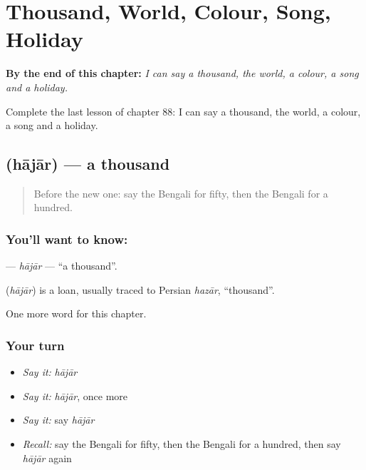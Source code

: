 
\chapter{Thousand, World, Colour, Song, Holiday}
\label{ch:bn-thousand-world-colour-song-holiday}

\begin{chapteropening}
\textbf{By the end of this chapter:} \emph{I can say a thousand, the world, a colour, a song and a holiday.}

Complete the last lesson of chapter 88: I can say a thousand, the world, a colour, a song and a holiday.
\end{chapteropening}

\section[\texorpdfstring{\bn{হাজার} (hājār)}{হাজার (hājār)}]{ (hājār) — a thousand}

\label{lesson:BN-C88-hajar}



\begin{quote}
Before the new one: say the Bengali for fifty, then the Bengali for a hundred.
\end{quote}

\subsection*{You'll want to know: }
\textbf{} — \emph{hājār} — \textquotedblleft{}a thousand\textquotedblright{}.

\begin{cousinweb}
\textbf{} (\emph{hājār}) is a loan, usually traced to Persian \emph{hazār}, \textquotedblleft{}thousand\textquotedblright{}.
\end{cousinweb}

\begin{grammarlens}[title={What you've built}]
One more word for this chapter.
\end{grammarlens}

\subsection*{Your turn}
\begin{itemize}
\raggedright
  \item \emph{Say it:} \emph{hājār}
  \item \emph{Say it:} \emph{hājār}, once more
  \item \emph{Say it:} say \emph{hājār}
  \item \emph{Recall:} say the Bengali for fifty, then the Bengali for a hundred, then say \emph{hājār} again
\end{itemize}

